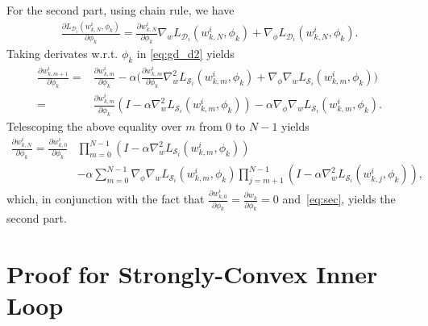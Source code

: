 \documentclass{osudissert96}
\begin{document}
For the second part, using chain rule, we have
\begin{align}\label{eq:sec}
\frac{\partial L_{\mathcal{D}_i}( w^i_{k,N}, \phi_k)}{\partial \phi_k} = \frac{\partial w^i_{k,N}}{\partial \phi_k}\nabla_w L_{\mathcal{D}_i}( w^i_{k,N}, \phi_k) + \nabla_\phi L_{\mathcal{D}_i}( w^i_{k,N}, \phi_k).
\end{align}
Taking derivates w.r.t. $\phi_k$ in \cref{eq:gd_d2} yields 
\begin{align*}
\frac{\partial w_{k,m+1}^i}{\partial \phi_k} = &\frac{\partial w_{k,m}^i}{\partial \phi_k} -\alpha \Big( \frac{\partial w_{k,m}^i}{\partial \phi_k}\nabla^2_w  L_{\mathcal{S}_i}(w_{k,m}^i,\phi_k) +\nabla_\phi \nabla_w L_{\mathcal{S}_i} (w_{k,m}^i,\phi_k)\Big) \nonumber
\\= &\frac{\partial w_{k,m}^i}{\partial \phi_k} (I - \alpha \nabla^2_w  L_{\mathcal{S}_i}(w_{k,m}^i,\phi_k)) - \alpha \nabla_\phi \nabla_w L_{\mathcal{S}_i} (w_{k,m}^i,\phi_k).
\end{align*}
Telescoping the above equality over $m$ from $0$ to $N-1$ yields
\begin{align*}
\frac{\partial w_{k,N}^i}{\partial \phi_k} = \frac{\partial w_{k,0}^i}{\partial \phi_k} &\prod_{m=0}^{N-1} (I - \alpha \nabla^2_w  L_{\mathcal{S}_i}(w_{k,m}^i,\phi_k) )  \nonumber
\\&- \alpha\sum_{m=0}^{N-1}\nabla_\phi\nabla_w L_{\mathcal{S}_i}(w_{k,m}^i,\phi_k)\prod_{j=m+1}^{N-1} (I-\alpha \nabla^2_{w} L_{\mathcal{S}_i}(w_{k,j}^i,\phi_k)),
\end{align*}
which, in conjunction with the fact that $\frac{\partial w_{k,0}^i}{\partial \phi_k}=\frac{\partial w_k}{\partial \phi_k}=0$ and~\cref{eq:sec}, yields the second part.%


\section{Proof for Strongly-Convex Inner Loop}\label{append:str}
\end{document}
